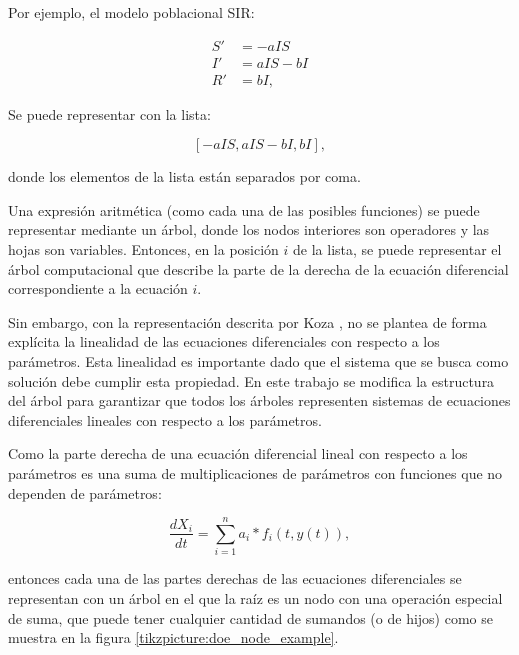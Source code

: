 Por ejemplo, el modelo poblacional SIR:

\begin{align*}
    S' & = - aIS    \\
    I' & = aIS - bI \\
    R' & = bI,
\end{align*}

Se puede representar con la lista:

$$[-aIS, aIS - bI, bI],$$

donde los elementos de la lista están separados por coma.

Una expresión aritmética (como cada una de las posibles funciones) se puede representar mediante un árbol, donde los nodos interiores son operadores y las hojas son variables. Entonces, en la posición $i$ de la lista, se puede representar el árbol computacional que describe la parte de la derecha de la ecuación diferencial correspondiente a la ecuación $i$.

Sin embargo, con la representación descrita por Koza \cite{zelinka2005analytic}, no se plantea de forma explícita la linealidad de las ecuaciones diferenciales con respecto a los parámetros. Esta linealidad es importante dado que el sistema que se busca como solución debe cumplir esta propiedad. En este trabajo se modifica la estructura del árbol para garantizar que todos los árboles representen sistemas de ecuaciones diferenciales lineales con respecto a los parámetros.

Como la parte derecha de una ecuación diferencial lineal con respecto a los parámetros es una suma de multiplicaciones de parámetros con funciones que no dependen de parámetros:

$$\frac{dX_i}{dt} = \sum_{i=1}^{n} a_i * f_i(t, y(t)),$$

entonces cada una de las partes derechas de las ecuaciones diferenciales se representan con un árbol en el que la raíz es un nodo con una operación especial de suma, que puede tener cualquier cantidad de sumandos (o de hijos) como se muestra en la figura \ref{tikzpicture:doe_node_example}.



